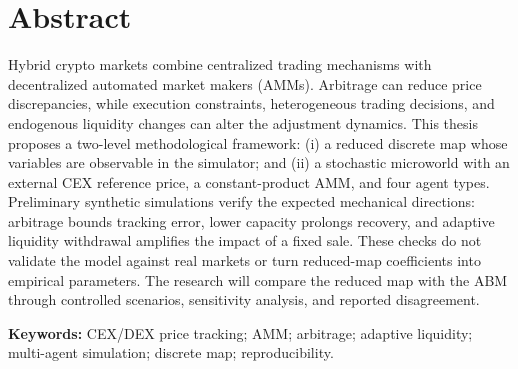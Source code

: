 \section{Abstract}

Hybrid crypto markets combine centralized trading mechanisms with decentralized
automated market makers (AMMs). Arbitrage can reduce price discrepancies, while
execution constraints, heterogeneous trading decisions, and endogenous liquidity
changes can alter the adjustment dynamics. This thesis proposes a two-level
methodological framework: (i) a reduced discrete map whose variables are observable in
the simulator; and (ii) a stochastic microworld with an external CEX reference price, a
constant-product AMM, and four agent types. Preliminary synthetic simulations verify
the expected mechanical directions: arbitrage bounds tracking error, lower capacity
prolongs recovery, and adaptive liquidity withdrawal amplifies the impact of a fixed
sale. These checks do not validate the model against real markets or turn reduced-map
coefficients into empirical parameters. The research will compare the reduced map with
the ABM through controlled scenarios, sensitivity analysis, and reported disagreement.

\textbf{Keywords:} CEX/DEX price tracking; AMM; arbitrage; adaptive liquidity;
multi-agent simulation; discrete map; reproducibility.

